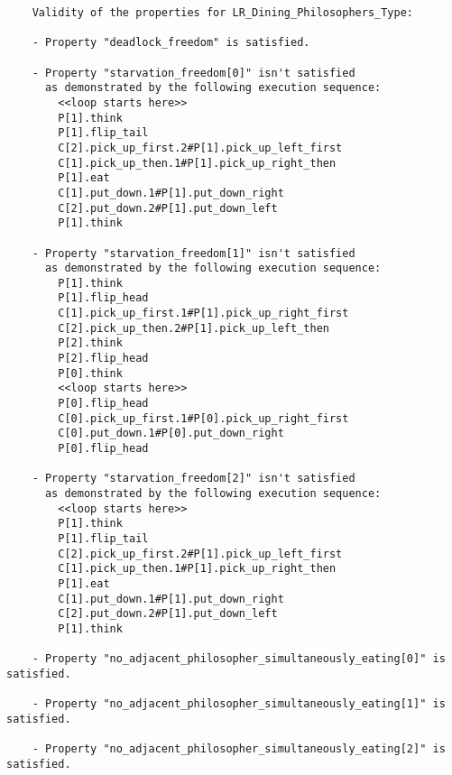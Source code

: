 	\begin{verbatim}
    Validity of the properties for LR_Dining_Philosophers_Type:

    - Property "deadlock_freedom" is satisfied.

    - Property "starvation_freedom[0]" isn't satisfied
      as demonstrated by the following execution sequence:
        <<loop starts here>>
        P[1].think
        P[1].flip_tail
        C[2].pick_up_first.2#P[1].pick_up_left_first
        C[1].pick_up_then.1#P[1].pick_up_right_then
        P[1].eat
        C[1].put_down.1#P[1].put_down_right
        C[2].put_down.2#P[1].put_down_left
        P[1].think

    - Property "starvation_freedom[1]" isn't satisfied
      as demonstrated by the following execution sequence:
        P[1].think
        P[1].flip_head
        C[1].pick_up_first.1#P[1].pick_up_right_first
        C[2].pick_up_then.2#P[1].pick_up_left_then
        P[2].think
        P[2].flip_head
        P[0].think
        <<loop starts here>>
        P[0].flip_head
        C[0].pick_up_first.1#P[0].pick_up_right_first
        C[0].put_down.1#P[0].put_down_right
        P[0].flip_head

    - Property "starvation_freedom[2]" isn't satisfied
      as demonstrated by the following execution sequence:
        <<loop starts here>>
        P[1].think
        P[1].flip_tail
        C[2].pick_up_first.2#P[1].pick_up_left_first
        C[1].pick_up_then.1#P[1].pick_up_right_then
        P[1].eat
        C[1].put_down.1#P[1].put_down_right
        C[2].put_down.2#P[1].put_down_left
        P[1].think

    - Property "no_adjacent_philosopher_simultaneously_eating[0]" is satisfied.

    - Property "no_adjacent_philosopher_simultaneously_eating[1]" is satisfied.

    - Property "no_adjacent_philosopher_simultaneously_eating[2]" is satisfied.
	\end{verbatim}

